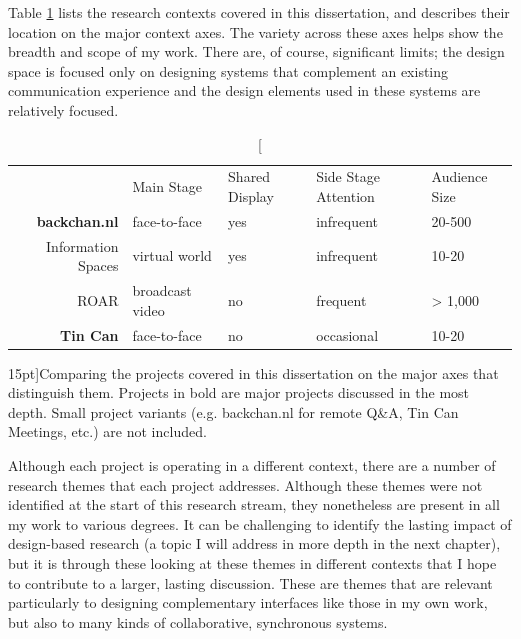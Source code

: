Table \ref{tab:project-axes} lists the research contexts covered in this dissertation, and describes their location on the major context axes. The variety across these axes helps show the breadth and scope of my work. There are, of course, significant limits; the design space is focused only on designing systems that complement an existing communication experience and the design elements used in these systems are relatively focused.

\begin{table}[tb]

\begin{tabular}{r|llll}
& Main Stage & Shared Display & Side Stage Attention & Audience Size \\
\textbf{backchan.nl} & face-to-face & yes & infrequent & 20-500 \\
Information Spaces & virtual world & yes & infrequent & 10-20 \\
ROAR & broadcast video & no & frequent & > 1,000 \\
\textbf{Tin Can} & face-to-face & no & occasional & 10-20 \\
\end{tabular}
\label{tab:project-axes}
\caption[][15pt]{Comparing the projects covered in this dissertation on the major axes that distinguish them. Projects in bold are major projects discussed in the most depth. Small project variants (e.g. backchan.nl for remote Q\&A, Tin Can Meetings, etc.) are not included.}
\end{table}


Although each project is operating in a different context, there are a number of research themes that each project addresses. Although these themes were not identified at the start of this research stream, they nonetheless are present in all my work to various degrees. It can be challenging to identify the lasting impact of design-based research (a topic I will address in more depth in the next chapter), but it is through these looking at these themes in different contexts that I hope to contribute to a larger, lasting discussion. These are themes that are relevant particularly to designing complementary interfaces like those in my own work, but also to many kinds of collaborative, synchronous systems.

